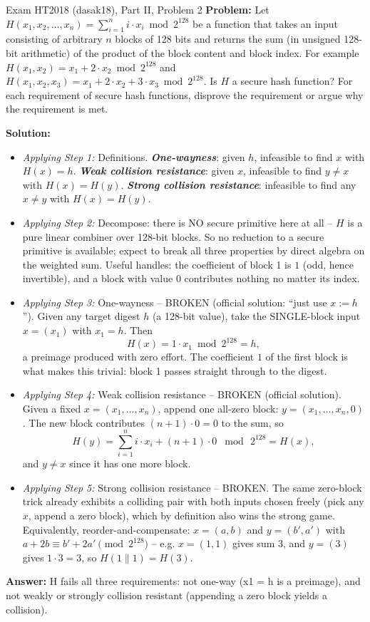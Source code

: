 \documentclass[12pt, a4paper]{article}
\newcommand{\term}[1]{\textbf{\textit{#1}}}        %
\begin{document}
\begin{practicebox}{Exam HT2018 (dasak18), Part II, Problem 2}
\textbf{Problem:} Let $H(x_1, x_2, \dots, x_n) = \sum_{i=1}^{n} i \cdot x_i \bmod 2^{128}$ be a function that takes an input consisting of arbitrary $n$ blocks of 128 bits and returns the sum (in unsigned 128-bit arithmetic) of the product of the block content and block index. For example $H(x_1, x_2) = x_1 + 2 \cdot x_2 \bmod 2^{128}$ and $H(x_1, x_2, x_3) = x_1 + 2 \cdot x_2 + 3 \cdot x_3 \bmod 2^{128}$. Is $H$ a secure hash function? For each requirement of secure hash functions, disprove the requirement or argue why the requirement is met.

\textbf{Solution:}
\begin{itemize}
    \item \textit{Applying Step 1:} Definitions. \term{One-wayness}: given $h$, infeasible to find $x$ with $H(x) = h$. \term{Weak collision resistance}: given $x$, infeasible to find $y \neq x$ with $H(x) = H(y)$. \term{Strong collision resistance}: infeasible to find any $x \neq y$ with $H(x) = H(y)$.
    \item \textit{Applying Step 2:} Decompose: there is NO secure primitive here at all -- $H$ is a pure linear combiner over 128-bit blocks. So no reduction to a secure primitive is available; expect to break all three properties by direct algebra on the weighted sum. Useful handles: the coefficient of block 1 is $1$ (odd, hence invertible), and a block with value $0$ contributes nothing no matter its index.
    \item \textit{Applying Step 3:} One-wayness -- BROKEN (official solution: ``just use $x := h$''). Given any target digest $h$ (a 128-bit value), take the SINGLE-block input $x = (x_1)$ with $x_1 = h$. Then
\[ H(x) = 1 \cdot x_1 \bmod 2^{128} = h, \]
a preimage produced with zero effort. The coefficient $1$ of the first block is what makes this trivial: block 1 passes straight through to the digest.
    \item \textit{Applying Step 4:} Weak collision resistance -- BROKEN (official solution). Given a fixed $x = (x_1, \dots, x_n)$, append one all-zero block: $y = (x_1, \dots, x_n, 0)$. The new block contributes $(n+1) \cdot 0 = 0$ to the sum, so
\[ H(y) = \sum_{i=1}^{n} i \cdot x_i + (n+1) \cdot 0 \;\bmod\, 2^{128} = H(x), \]
and $y \neq x$ since it has one more block.
    \item \textit{Applying Step 5:} Strong collision resistance -- BROKEN. The same zero-block trick already exhibits a colliding pair with both inputs chosen freely (pick any $x$, append a zero block), which by definition also wins the strong game. Equivalently, reorder-and-compensate: $x = (a, b)$ and $y = (b', a')$ with $a + 2b \equiv b' + 2a' \pmod{2^{128}}$ -- e.g. $x = (1, 1)$ gives sum $3$, and $y = (3)$ gives $1 \cdot 3 = 3$, so $H(1 \| 1) = H(3)$.
\end{itemize}
\textbf{Answer:} H fails all three requirements: not one-way (x1 = h is a preimage), and not weakly or strongly collision resistant (appending a zero block yields a collision).
\end{practicebox}
\end{document}

